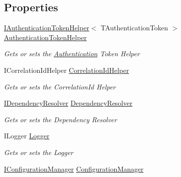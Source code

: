 \subsection*{Properties}
\begin{DoxyCompactItemize}
\item 
\hyperlink{interfaceCqrs_1_1Authentication_1_1IAuthenticationTokenHelper}{I\+Authentication\+Token\+Helper}$<$ T\+Authentication\+Token $>$ \hyperlink{classCqrs_1_1Bus_1_1InProcessBus_a20d068b944183ab04e77c3164d19a860_a20d068b944183ab04e77c3164d19a860}{Authentication\+Token\+Helper}
\begin{DoxyCompactList}\small\item\em Gets or sets the \hyperlink{namespaceCqrs_1_1Authentication}{Authentication} Token Helper \end{DoxyCompactList}\item 
I\+Correlation\+Id\+Helper \hyperlink{classCqrs_1_1Bus_1_1InProcessBus_a3ab05953af552331928ca0f1131c269d_a3ab05953af552331928ca0f1131c269d}{Correlation\+Id\+Helper}
\begin{DoxyCompactList}\small\item\em Gets or sets the Correlation\+Id Helper \end{DoxyCompactList}\item 
\hyperlink{interfaceCqrs_1_1Configuration_1_1IDependencyResolver}{I\+Dependency\+Resolver} \hyperlink{classCqrs_1_1Bus_1_1InProcessBus_a2eafea26a2848880fdbf84717b8e60e1_a2eafea26a2848880fdbf84717b8e60e1}{Dependency\+Resolver}
\begin{DoxyCompactList}\small\item\em Gets or sets the Dependency Resolver \end{DoxyCompactList}\item 
I\+Logger \hyperlink{classCqrs_1_1Bus_1_1InProcessBus_a6d20e32f64b6dfce12852083f0c641c8_a6d20e32f64b6dfce12852083f0c641c8}{Logger}
\begin{DoxyCompactList}\small\item\em Gets or sets the Logger \end{DoxyCompactList}\item 
\hyperlink{interfaceCqrs_1_1Configuration_1_1IConfigurationManager}{I\+Configuration\+Manager} \hyperlink{classCqrs_1_1Bus_1_1InProcessBus_a403133ecfdbdfa85090366f1d5f95230_a403133ecfdbdfa85090366f1d5f95230}{Configuration\+Manager}

\end{DoxyCompactItemize}
